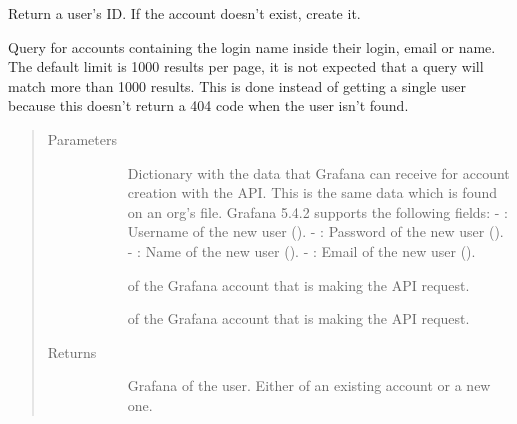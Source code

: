\documentclass[letterpaper,10pt,english]{sphinxmanual}
\begin{document}
\begin{fulllineitems}
\label{\detokenize{accounts:gpAccounts.getOrCreateUser}}
Return a user’s ID. If the account doesn’t exist, create it.

Query for accounts containing the login name inside their login, email or name.
The default limit is 1000 results per page, it is not expected that a query
will match more than 1000 results. This is done instead of getting a single
user because this doesn’t return a 404 code when the user isn’t found.
\begin{quote}\begin{description}
\item[{Parameters}] \leavevmode\begin{description}
\item[{}] \leavevmode{[}\sphinxtitleref{dict}{]}
Dictionary with the data that Grafana can receive for account creation with
the API. This is the same data which is found on an org’s 
file. Grafana 5.4.2 supports the following fields:
- : Username of the new user ().
- : Password of the new user ().
- : Name of the new user ().
- : Email of the new user ().

\item[{}] \leavevmode{[}\sphinxtitleref{str}{]}
 of the Grafana account that is making the API request.

\item[{}] \leavevmode{[}\sphinxtitleref{str}{]}
 of the Grafana account that is making the API request.

\end{description}

\item[{Returns}] \leavevmode\begin{description}
\item[{}] \leavevmode{[}\sphinxtitleref{int}{]}
Grafana  of the user. Either of an existing account or a new one.


\end{description}
\end{description}
\end{quote}
\end{fulllineitems}
\end{document}
